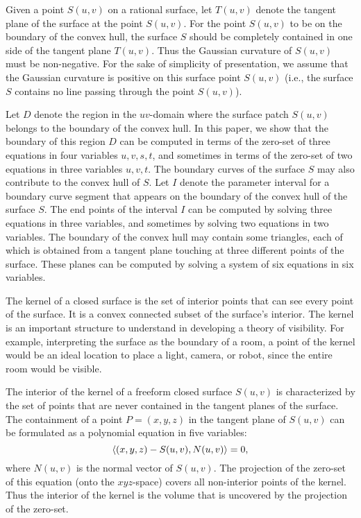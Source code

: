 \documentclass{elsart}
\begin{document}
Given a point $S(u,v)$ on a rational surface, let $T(u,v)$ denote
the tangent plane of the surface at the point $S(u,v)$.
For the point $S(u,v)$ to be on the boundary of the convex hull,
the surface $S$ should be completely contained in one side of
the tangent plane $T(u,v)$.  Thus the Gaussian curvature of $S(u,v)$ 
must be non-negative.  For the sake of simplicity of presentation,
we assume that the Gaussian curvature is positive
on this surface point $S(u,v)$ (i.e., the surface $S$ contains
no line passing through the point $S(u,v)$).

Let $D$ denote the region in the $uv$-domain where the surface
patch $S(u,v)$ belongs to the boundary of the convex hull.
In this paper, we show that the boundary of this region $D$
can be computed in terms of the zero-set of three equations in
four variables $u,v,s,t$, and sometimes in terms of the zero-set of
two equations in three variables $u,v,t$.  The boundary curves
of the surface $S$ may also contribute to the convex hull of $S$.
Let $I$ denote the parameter interval for a boundary curve segment
that appears on the boundary of the convex hull of the surface $S$.
The end points of the interval $I$ can be computed
by solving three equations in three variables,
and sometimes by solving two equations in two variables.
The boundary of the convex hull may contain some triangles,
each of which is obtained from a tangent plane touching at three 
different points of the surface.  These planes can be computed
by solving a system of six equations in six variables.

The kernel of a closed surface is the set of interior points
that can see every point of the surface.
It is a convex connected subset of the surface's interior.
The kernel is an important structure to understand in developing a theory of visibility.
For example, interpreting the surface as the boundary of a room,
a point of the kernel would be an ideal location to place a light, camera, or robot,
since the entire room would be visible.

The interior of the kernel of a freeform closed surface $S(u,v)$
is characterized by the set of points that are never contained
in the tangent planes of the surface.  The containment of
a point $P = (x,y,z)$ in the tangent plane of $S(u,v)$ can be
formulated as a polynomial equation in five variables:
\[
\left<{(x,y,z)-S(u,v)}, {N(u,v)} \right> = 0,
\]
where $N(u,v)$ is the normal vector of $S(u,v)$.
The projection of the zero-set of this equation
(onto the $xyz$-space) covers all non-interior points of the kernel.
Thus the interior of the kernel is the volume
that is uncovered by the projection of the zero-set.
\end{document}
